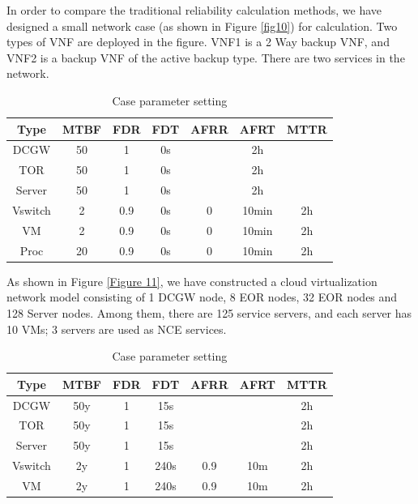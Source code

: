 \documentclass[journal]{IEEEtran}
\begin{document}
    In order to compare the traditional reliability calculation methods, we have designed a small network case (as shown in Figure \ref{fig10}) for calculation. Two types of VNF are deployed in the figure. VNF1 is a 2 Way backup VNF, and VNF2 is a backup VNF of the active backup type. There are two services in the network.

    \begin{table}[!t]
        \renewcommand{\arraystretch}{1.3}
        \caption{Case parameter setting}
        \label{tab5}
        \centering
        \begin{tabular}{|c|c|c|c|c|c|c|}
            \hline
            Type    & MTBF  & FDR & FDT & AFRR & AFRT  & MTTR  \\
            \hline
            DCGW    & 50   & 1   & 0s  &      & 2h    &      \\
            TOR     & 50   & 1   & 0s  &      & 2h    &      \\
            Server  & 50   & 1   & 0s  &      & 2h    &      \\
            Vswitch & 2    & 0.9 & 0s  & 0    & 10min & 2h   \\
            VM      & 2    & 0.9 & 0s  & 0    & 10min & 2h   \\
            Proc    & 20   & 0.9 & 0s  & 0    & 10min & 2h   \\
            \hline
        \end{tabular}
    \end{table}

    As shown in Figure \ref{Figure 11}, we have constructed a cloud virtualization network model consisting of 1 DCGW node, 8 EOR nodes, 32 EOR nodes and 128 Server nodes. Among them, there are 125 service servers, and each server has 10 VMs; 3 servers are used as NCE services.

    \begin{table}[!t]
        \renewcommand{\arraystretch}{1.3}
        \caption{Case parameter setting}
        \label{tab5}
        \centering
        \begin{tabular}{|c|c|c|c|c|c|c|}
            \hline
            Type    & MTBF & FDR & FDT  & AFRR & AFRT & MTTR \\
            \hline
            DCGW    & 50y   & 1 & 15s  &      &   	& 2h     \\
            TOR     & 50y   & 1 & 15s  &      &    &   2h   \\
            Server  & 50y   & 1 & 15s  &      & 	   &  2h    \\
            Vswitch & 2y    & 1 & 240s & 0.9    & 10m   & 2h   \\
            VM      & 2y    & 1 & 240s & 0.9  & 10m   & 2h   \\
            \hline
        \end{tabular}
    \end{table}
\end{document}
